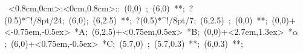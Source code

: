 \hbox{
\xy    <0.8cm,0cm>:<0cm,0.8cm>::
       (0,0) ; (6,0) **\dir{-}; ?(0.5)*^!/8pt/{24};
       (6,0); (6,2.5) **\dir{-}; ?(0.5)*^!/8pt/{7}; 
       (6,2.5) ; (0,0) **\dir{-};  
       (0,0)+<-0.75em,-0.5ex> *{A};
       (6,2.5)+<0.75em,0.5ex> *{B};
       (0,0)+<2.7em,1.3ex> *\hbox{$\alpha$};
       (6,0)+<0.75em,-0.5ex> *{C};
	(5.7,0) ; (5.7,0.3) **\dir{-}; (6,0.3) **\dir{-};
       \endxy}
	   
